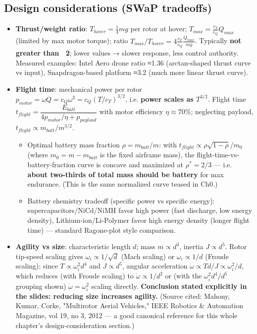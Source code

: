 \documentclass[11pt]{article}
\begin{document}
\subsection{Design considerations (SWaP tradeoffs)}
\begin{itemize}
\item \textbf{Thrust/weight ratio}: $T_{hover}=\tfrac14mg$ per rotor at hover; $T_{max}=\tfrac{c_T}{c_Q}Q_{max}$ (limited by max motor torque); ratio $T_{max}/T_{hover}=4\frac{c_T}{c_Q}\frac{Q_{max}}{mg}$. Typically \textbf{not greater than ~2}; lower values → slower response, less control authority. Measured examples: Intel Aero drone ratio ≈1.36 (arctan-shaped thrust curve vs input), Snapdragon-based platform ≈3.2 (much more linear thrust curve).
\item \textbf{Flight time}: mechanical power per rotor $p_{motor}=\omega Q=c_Q\omega^3=c_Q(T/c_T)^{3/2}$, i.e. \textbf{power scales as $T^{3/2}$}. Flight time $t_{flight}=\dfrac{E_{batt}}{4p_{motor}/\eta+p_{payload}}$ with motor efficiency $\eta\approx70\%$; neglecting payload, $t_{flight}\propto m_{batt}/m^{3/2}$.
\begin{itemize}
\item Optimal battery mass fraction $\rho=m_{batt}/m$: with $t_{flight}\propto \rho\sqrt{1-\rho}/m_0$ (where $m_0=m-m_{batt}$ is the fixed airframe mass), the flight-time-vs-battery-fraction curve is concave and maximized at $\rho^*=2/3$ — i.e. \textbf{about two-thirds of total mass should be battery} for max endurance. (This is the same normalized curve teased in Ch0.)
\item Battery chemistry tradeoff (specific power vs specific energy): supercapacitors/NiCd/NiMH favor high power (fast discharge, low energy density), Lithium-ion/Li-Polymer favor high energy density (longer flight time) — standard Ragone-plot style comparison.
\end{itemize}
\item \textbf{Agility vs size}: characteristic length $d$; mass $m\propto d^3$, inertia $J\propto d^5$. Rotor tip-speed scaling gives $\omega_i\propto 1/\sqrt d$ (Mach scaling) or $\omega_i\propto 1/d$ (Froude scaling); since $T\propto\omega_i^2d^4$ and $J\propto d^5$, angular acceleration $\dot\omega\propto Td/J\propto \omega_i^2/d$, which reduces (with Froude scaling) to $\dot\omega\propto1/d^2$ or (with the $\omega_i^2 d^4/d^5$ grouping shown) $\dot\omega=\omega_i^2$ scaling directly. \textbf{Conclusion stated explicitly in the slides: reducing size increases agility.} (Source cited: Mahony, Kumar, Corke, "Multirotor Aerial Vehicles," IEEE Robotics \& Automation Magazine, vol 19, no 3, 2012 — a good canonical reference for this whole chapter's design-consideration section.)
\end{itemize}
\end{document}
